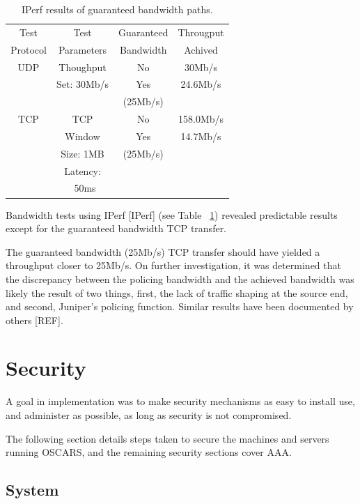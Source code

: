 \documentclass[conference]{IEEEtran}
\begin{document}
\begin{table}
 \centering
 {\scriptsize
 \begin{tabular}{|c|c|c|c|}
 \hline
 Test     & Test       & Guaranteed & Througput  \\ 
 Protocol & Parameters & Bandwidth  & Achived    \\ \hline \hline 
 UDP      & Thoughput  & No         &   30Mb/s   \\ \cline{3-4}
          & Set: 30Mb/s& Yes        &   24.6Mb/s \\ 
          &            & (25Mb/s)   &            \\ \hline 
 TCP      & TCP        & No         & 158.0Mb/s  \\ \cline{3-4}
          & Window     & Yes        &  14.7Mb/s  \\ 
          & Size: 1MB  & (25Mb/s)   &            \\ 
          & Latency:   &            &            \\ 
          & ~50ms      &            &            \\ \hline
 \end{tabular}
 }
 \caption{IPerf results of guaranteed bandwidth paths.}
 \label{tab:bandwidth}
\end{table}


Bandwidth tests using IPerf [IPerf] (see Table ~\ref{tab:bandwidth}) revealed
predictable results except for the guaranteed bandwidth TCP transfer.

The guaranteed bandwidth (25Mb/s) TCP transfer should have yielded a 
throughput closer to 25Mb/s.  On further investigation, it was determined 
that the 
discrepancy between the policing bandwidth and the achieved bandwidth was 
likely the result of two things, first, the lack of traffic shaping at the 
source end, and second, Juniper's policing function.  Similar results have 
been documented by others [REF].


\section{Security}
A goal in implementation was to make security mechanisms as easy to install
use, and administer as possible, as long as security is not compromised.

The following section details steps taken to secure the machines and 
servers running OSCARS, and the remaining security sections cover AAA.

\subsection{System}
\end{document}
